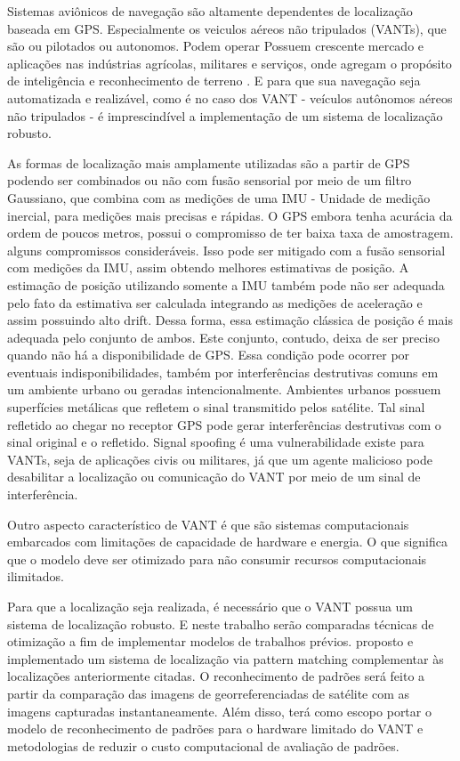 
Sistemas aviônicos de navegação são altamente dependentes de localização baseada em GPS. Especialmente os
veiculos aéreos não tripulados (VANTs), que são ou pilotados ou autonomos. Podem operar Possuem crescente mercado e aplicações nas indústrias agrícolas,
militares e serviços, onde agregam o propósito de inteligência e reconhecimento 
de terreno . E para que sua navegação seja automatizada e
realizável, como é no caso dos VANT \-- veículos autônomos aéreos não tripulados
\-- é imprescindível a implementação de um sistema de localização robusto.

As formas de localização mais amplamente utilizadas são a partir de GPS podendo
ser combinados ou não com fusão sensorial por meio de um filtro Gaussiano, que
combina com as medições de uma IMU \-- Unidade de medição inercial, para
medições mais precisas e rápidas. O GPS embora tenha acurácia da ordem de poucos
metros, possui o compromisso de ter baixa taxa de amostragem. alguns
compromissos consideráveis. Isso pode ser mitigado com a fusão sensorial com
medições da IMU, assim obtendo melhores estimativas de posição. A estimação de
posição utilizando somente a IMU também pode não ser adequada pelo fato da
estimativa ser calculada integrando as medições de aceleração e assim possuindo
alto drift. Dessa forma, essa estimação clássica de posição é mais adequada pelo
conjunto de ambos. Este conjunto, contudo, deixa de ser preciso quando não há a
disponibilidade de GPS. Essa condição pode ocorrer por eventuais
indisponibilidades, também por interferências destrutivas comuns em um ambiente
urbano ou geradas intencionalmente. Ambientes urbanos possuem superfícies
metálicas que refletem o sinal transmitido pelos satélite. Tal sinal refletido
ao chegar no receptor GPS pode gerar interferências destrutivas com o sinal
original e o refletido. Signal spoofing é uma vulnerabilidade existe para VANTs,
seja de aplicações civis ou militares, já que um agente malicioso pode
desabilitar a localização ou comunicação do VANT por meio de um sinal de
interferência.

Outro aspecto característico de VANT é que são sistemas computacionais embarcados com limitações de capacidade de hardware e energia. O que significa que o modelo deve ser otimizado para não consumir recursos computacionais ilimitados.

Para que a localização seja realizada, é necessário que o VANT possua um sistema de localização robusto. E neste trabalho serão comparadas técnicas de otimização a fim de implementar modelos de trabalhos prévios.  proposto e implementado um sistema de localização via pattern matching complementar às localizações anteriormente citadas. O reconhecimento de padrões será feito a partir da comparação das imagens de georreferenciadas de satélite com as imagens capturadas instantaneamente. Além disso, terá como escopo portar o modelo de reconhecimento de padrões para o hardware limitado do VANT e metodologias de reduzir o custo computacional de avaliação de padrões.


